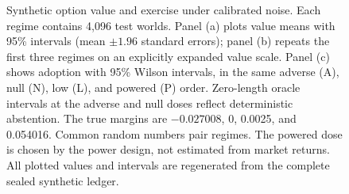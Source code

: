 \begin{figure}[!htbp]
\caption{Synthetic option value and exercise under calibrated noise.
Each regime contains 4,096 test worlds. Panel (a) plots value means with
95\% intervals (mean $\pm1.96$ standard errors); panel (b) repeats the first
three regimes on an explicitly expanded value scale. Panel (c) shows adoption
with 95\% Wilson intervals, in the same adverse (A), null (N), low (L), and
powered (P) order. Zero-length oracle intervals at the adverse and null doses
reflect deterministic abstention. The true margins are $-0.027008$, 0,
0.0025, and 0.054016. Common random numbers pair regimes. The powered dose is
chosen by the power design, not estimated from market returns. All plotted
values and intervals are regenerated from the complete sealed synthetic ledger.}
\label{fig:synthetic-results}
\end{figure}
